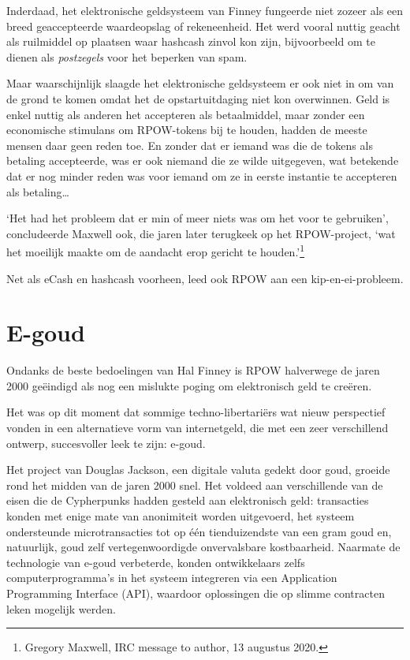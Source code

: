 \documentclass[
  a5paper,
  smalldemyvopaper,11pt,twoside,onecolumn,openright,extrafontsizes,
hidelinks]{memoir}
\begin{document}
Inderdaad, het elektronische geldsysteem van Finney fungeerde niet
zozeer als een breed geaccepteerde waardeopslag of rekeneenheid. Het
werd vooral nuttig geacht als ruilmiddel op plaatsen waar hashcash
zinvol kon zijn, bijvoorbeeld om te dienen als \emph{postzegels} voor
het beperken van spam.

Maar waarschijnlijk slaagde het elektronische geldsysteem er ook niet in
om van de grond te komen omdat het de opstartuitdaging niet kon
overwinnen. Geld is enkel nuttig als anderen het accepteren als
betaalmiddel, maar zonder een economische stimulans om RPOW-tokens bij
te houden, hadden de meeste mensen daar geen reden toe. En zonder dat er
iemand was die de tokens als betaling accepteerde, was er ook niemand
die ze wilde uitgegeven, wat betekende dat er nog minder reden was voor
iemand om ze in eerste instantie te accepteren als betaling\ldots{}

`Het had het probleem dat er min of meer niets was om het voor te
gebruiken', concludeerde Maxwell ook, die jaren later terugkeek op het
RPOW-project, `wat het moeilijk maakte om de aandacht erop gericht te
houden.'\footnote{Gregory Maxwell, IRC message to author, 13 augustus
  2020.}

Net als eCash en hashcash voorheen, leed ook RPOW aan een
kip-en-ei-probleem.

\section{E-goud}\label{e-goud}

Ondanks de beste bedoelingen van Hal Finney is RPOW halverwege de jaren
2000 geëindigd als nog een mislukte poging om elektronisch geld te
creëren.

Het was op dit moment dat sommige techno-libertariërs wat nieuw
perspectief vonden in een alternatieve vorm van internetgeld, die met
een zeer verschillend ontwerp, succesvoller leek te zijn: e-goud.

Het project van Douglas Jackson, een digitale valuta gedekt door goud,
groeide rond het midden van de jaren 2000 snel. Het voldeed aan
verschillende van de eisen die de Cypherpunks hadden gesteld aan
elektronisch geld: transacties konden met enige mate van anonimiteit
worden uitgevoerd, het systeem ondersteunde microtransacties tot op één
tienduizendste van een gram goud en, natuurlijk, goud zelf
vertegenwoordigde onvervalsbare kostbaarheid. Naarmate de technologie
van e-goud verbeterde, konden ontwikkelaars zelfs computerprogramma's in
het systeem integreren via een Application Programming Interface (API),
waardoor oplossingen die op slimme contracten leken mogelijk werden.
\end{document}

